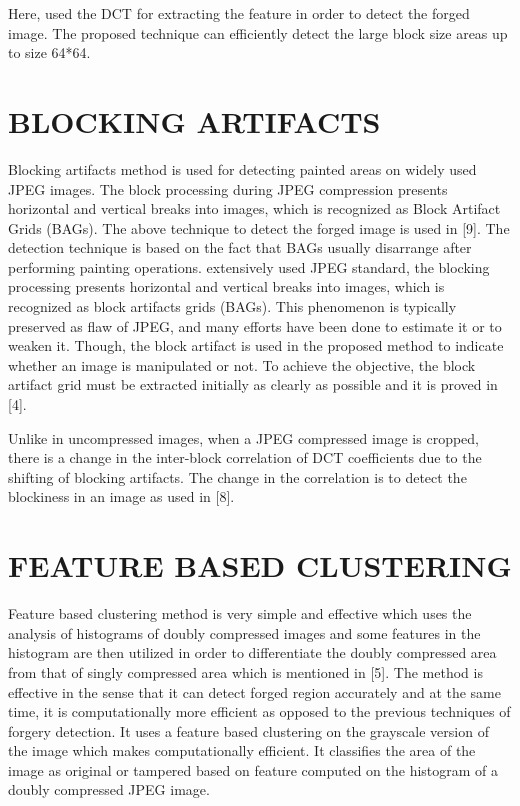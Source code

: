 \bigskip
Here, \cite{somnath} used the DCT for extracting the feature in order to detect the forged image. The proposed technique can efficiently detect the large block size areas up to size 64*64. 
\bigskip

\bigskip
\section{BLOCKING ARTIFACTS}
Blocking artifacts method is used for detecting painted areas on widely used JPEG images. The block processing during JPEG compression presents horizontal and vertical breaks into images, which is recognized as Block Artifact Grids (BAGs). The above technique to detect the forged image is used in [9]. The detection technique is based on the fact that BAGs usually disarrange after performing painting operations. extensively used JPEG standard, the blocking processing presents horizontal and vertical breaks into images, which is recognized as block artifacts grids (BAGs). This phenomenon is typically preserved as flaw of JPEG, and many efforts have been done to estimate it or to weaken it. Though, the block artifact is used in the proposed method to indicate whether an image is manipulated or not. To achieve the objective, the block artifact grid must be extracted initially as clearly as possible and it is proved in [4].

\bigskip
Unlike in uncompressed images, when a JPEG compressed image is cropped, there is a change in the inter-block correlation of DCT coefficients due to the shifting of blocking artifacts. The change in the correlation is to detect the blockiness in an image as used in [8].
\section{FEATURE BASED CLUSTERING}
Feature based clustering method is very simple and effective which uses the analysis of histograms of doubly compressed images and some features in the histogram are then utilized in order to differentiate the doubly compressed area from that of singly compressed area which is mentioned in [5]. The method is effective in the sense that it can detect forged region accurately and at the same time, it is computationally more efficient as opposed to the previous techniques of forgery detection. It uses a feature based clustering on the grayscale version of the image which makes computationally efficient. It classifies the area of the image as original or tampered based on feature computed on the histogram of a doubly compressed JPEG image.

